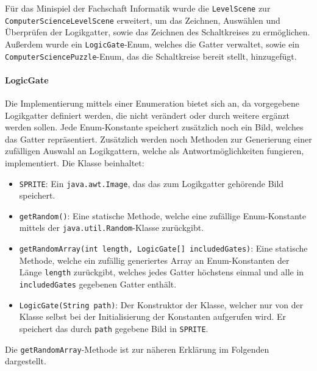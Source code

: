 \begin{sloppypar}
    Für das Minispiel der Fachschaft Informatik wurde die \texttt{LevelScene} zur \texttt{ComputerScienceLevelScene} erweitert, um das Zeichnen, Auswählen und Überprüfen der Logikgatter, sowie das Zeichnen des Schaltkreises zu ermöglichen.
    Außerdem wurde ein \texttt{LogicGate}-Enum, welches die Gatter verwaltet, sowie ein \texttt{ComputerSciencePuzzle}-Enum, das die Schaltkreise bereit stellt, hinzugefügt.    
\end{sloppypar}

\paragraph{LogicGate} Die Implementierung mittels einer Enumeration bietet sich an, da vorgegebene Logikgatter definiert werden, die nicht verändert oder durch weitere ergänzt werden sollen.
Jede Enum-Konstante speichert zusätzlich noch ein Bild, welches das Gatter repräsentiert.
Zusätzlich werden noch Methoden zur Generierung einer zufälligen Auswahl an Logikgattern, welche als Antwortmöglichkeiten fungieren, implementiert.
Die Klasse beinhaltet:

\begin{sloppypar}
    \begin{itemize}
        \item \texttt{SPRITE}: Ein \texttt{java.awt.Image}, das das zum Logikgatter gehörende Bild speichert.
        \item \texttt{getRandom()}: Eine statische Methode, welche eine zufällige Enum-Konstante mittels der \texttt{java.util.Random}-Klasse zurückgibt.
        \item \texttt{getRandomArray(int length, LogicGate[] includedGates)}: Eine statische Methode, welche ein zufällig generiertes Array an Enum-Konstanten der Länge \texttt{length} zurückgibt, welches jedes Gatter höchstens einmal und alle in \texttt{includedGates} gegebenen Gatter enthält. 
        \item \texttt{LogicGate(String path)}: Der Konstruktor der Klasse, welcher nur von der Klasse selbst bei der Initialisierung der Konstanten aufgerufen wird.
            Er speichert das durch \texttt{path} gegebene Bild in \texttt{SPRITE}.
    \end{itemize}
\end{sloppypar}

Die \texttt{getRandomArray}-Methode ist zur näheren Erklärung im Folgenden dargestellt.

